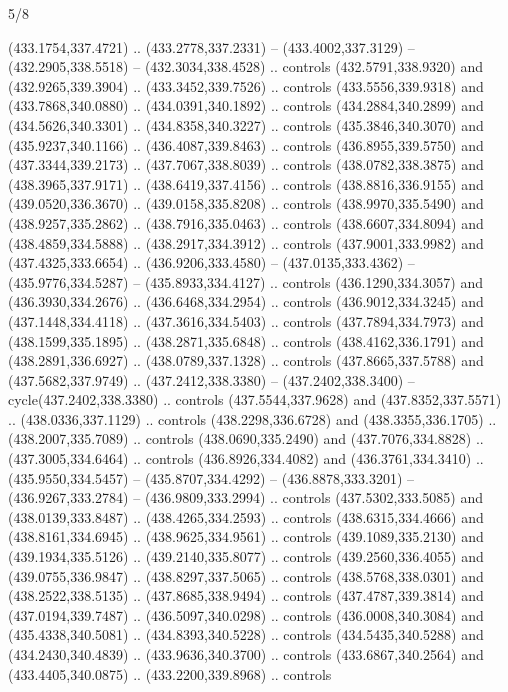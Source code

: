 \begin{flagdescription}{5/8}
\begin{scope}[shift={(0.5\flaglength,0.5\flagwidth)},scale=\flagwidth*\stretchfactor/820]
\begin{scope}[scale=1.84,xshift=-135mm,yshift=84mm]
\begin{scope}[y=0.80pt, x=0.80pt, yscale=-1, xscale=1]
\begin{scope}[cm={{1.01416,0.0,0.0,1.033,(-6.79641,-9.89449)}}]
\begin{scope}[cm={{-0.99877,-0.04957,-0.04957,0.99877,(973.59129,23.68641)}}]
\begin{scope}[draw=c485654,fill=c8c959d,line width=0.087\lw]
  (433.1754,337.4721) .. (433.2778,337.2331) -- (433.4002,337.3129) --
  (432.2905,338.5518) -- (432.3034,338.4528) .. controls (432.5791,338.9320) and
  (432.9265,339.3904) .. (433.3452,339.7526) .. controls (433.5556,339.9318) and
  (433.7868,340.0880) .. (434.0391,340.1892) .. controls (434.2884,340.2899) and
  (434.5626,340.3301) .. (434.8358,340.3227) .. controls (435.3846,340.3070) and
  (435.9237,340.1166) .. (436.4087,339.8463) .. controls (436.8955,339.5750) and
  (437.3344,339.2173) .. (437.7067,338.8039) .. controls (438.0782,338.3875) and
  (438.3965,337.9171) .. (438.6419,337.4156) .. controls (438.8816,336.9155) and
  (439.0520,336.3670) .. (439.0158,335.8208) .. controls (438.9970,335.5490) and
  (438.9257,335.2862) .. (438.7916,335.0463) .. controls (438.6607,334.8094) and
  (438.4859,334.5888) .. (438.2917,334.3912) .. controls (437.9001,333.9982) and
  (437.4325,333.6654) .. (436.9206,333.4580) -- (437.0135,333.4362) --
  (435.9776,334.5287) -- (435.8933,334.4127) .. controls (436.1290,334.3057) and
  (436.3930,334.2676) .. (436.6468,334.2954) .. controls (436.9012,334.3245) and
  (437.1448,334.4118) .. (437.3616,334.5403) .. controls (437.7894,334.7973) and
  (438.1599,335.1895) .. (438.2871,335.6848) .. controls (438.4162,336.1791) and
  (438.2891,336.6927) .. (438.0789,337.1328) .. controls (437.8665,337.5788) and
  (437.5682,337.9749) .. (437.2412,338.3380) -- (437.2402,338.3400) --
  cycle(437.2402,338.3380) .. controls (437.5544,337.9628) and
  (437.8352,337.5571) .. (438.0336,337.1129) .. controls (438.2298,336.6728) and
  (438.3355,336.1705) .. (438.2007,335.7089) .. controls (438.0690,335.2490) and
  (437.7076,334.8828) .. (437.3005,334.6464) .. controls (436.8926,334.4082) and
  (436.3761,334.3410) .. (435.9550,334.5457) -- (435.8707,334.4292) --
  (436.8878,333.3201) -- (436.9267,333.2784) -- (436.9809,333.2994) .. controls
  (437.5302,333.5085) and (438.0139,333.8487) .. (438.4265,334.2593) .. controls
  (438.6315,334.4666) and (438.8161,334.6945) .. (438.9625,334.9561) .. controls
  (439.1089,335.2130) and (439.1934,335.5126) .. (439.2140,335.8077) .. controls
  (439.2560,336.4055) and (439.0755,336.9847) .. (438.8297,337.5065) .. controls
  (438.5768,338.0301) and (438.2522,338.5135) .. (437.8685,338.9494) .. controls
  (437.4787,339.3814) and (437.0194,339.7487) .. (436.5097,340.0298) .. controls
  (436.0008,340.3084) and (435.4338,340.5081) .. (434.8393,340.5228) .. controls
  (434.5435,340.5288) and (434.2430,340.4839) .. (433.9636,340.3700) .. controls
  (433.6867,340.2564) and (433.4405,340.0875) .. (433.2200,339.8968) .. controls

\end{scope}
\end{scope}
\end{scope}
\end{scope}
\end{scope}
\end{scope}
\end{flagdescription}
